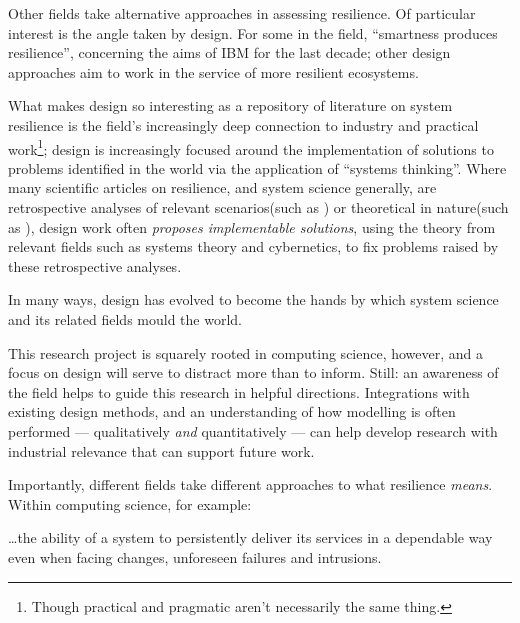 \documentclass{article}
\begin{document}
Other fields take alternative approaches in assessing resilience. Of particular
interest is the angle taken by design. For some in the field, ``smartness
produces resilience''\cite{halpern_grey_room}, concerning the aims of IBM for
the last decade; other design approaches aim to work in the service of more
resilient ecosystems\cite{public_sediment}.\par

What makes design so interesting as a repository of literature on system
resilience is the field's increasingly deep connection to industry and practical
work\footnote{Though practical and pragmatic aren't necessarily the same
  thing.}; design is increasingly focused around the implementation of solutions
to problems identified in the world via the application of ``systems thinking''.
Where many scientific articles on resilience, and system science generally, are
retrospective analyses of relevant scenarios(such as \cite{johnson_shea_rail})
or theoretical in nature(such as \cite{statistical_physics_self_replication}),
design work often \emph{proposes implementable solutions}, using the theory from
relevant fields such as systems theory and cybernetics, to fix problems raised
by these retrospective analyses.\par

In many ways, design has evolved to become the hands by which system science and
its related fields mould the world.\par

This research project is squarely rooted in computing science, however, and a
focus on design will serve to distract more than to inform. Still: an awareness
of the field helps to guide this research in helpful directions. Integrations
with existing design methods, and an understanding of how modelling is often
performed --- qualitatively \emph{and} quantitatively --- can help develop
research with industrial relevance that can support future work.\par

Importantly, different fields take different approaches to what resilience
\emph{means}. Within computing science, for
example\cite{biology_software_same_coin}:

\begin{displayquote}
  \ldots{}the ability of a system to persistently deliver its services in a
  dependable way even when facing changes, unforeseen failures and intrusions.
\end{displayquote}
\end{document}
